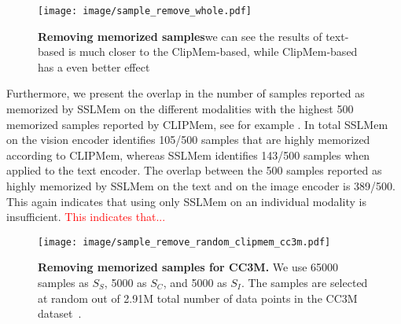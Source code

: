 \begin{figure}[t]
    \centering
    \texttt{[image: image/sample\_remove\_whole.pdf]}
    \caption{\textbf{Removing memorized samples}we can see the results of text-based is much closer to the ClipMem-based, while ClipMem-based has a even better effect}
    \label{fig:image_sample_remove_whole}
\end{figure}


Furthermore, we present the overlap in the number of samples reported as memorized by SSLMem on the different modalities with the highest 500 memorized samples reported by CLIPMem, see for example .
In total SSLMem on the vision encoder identifies 105/500 samples that are highly memorized according to CLIPMem, whereas SSLMem identifies 143/500 samples when applied to the text encoder.
The overlap between the 500 samples reported as highly memorized by SSLMem on the text and on the image encoder is 389/500. This again indicates that using only SSLMem on an individual modality is insufficient. 
\textcolor{red}{This indicates that...}

\begin{figure}[t]
    \centering
    \texttt{[image: image/sample\_remove\_random\_clipmem\_cc3m.pdf]}
    \caption{\textbf{Removing memorized samples for CC3M.} We use 65000 samples as $S_S$, 5000 as $S_C$, and 5000 as $S_I$. 
    The samples are selected at random out of 2.91M total number of data points in the CC3M dataset~\citep{sharma2018conceptual}.}
    \label{fig:image_text_sample_cc3m}
\end{figure}




